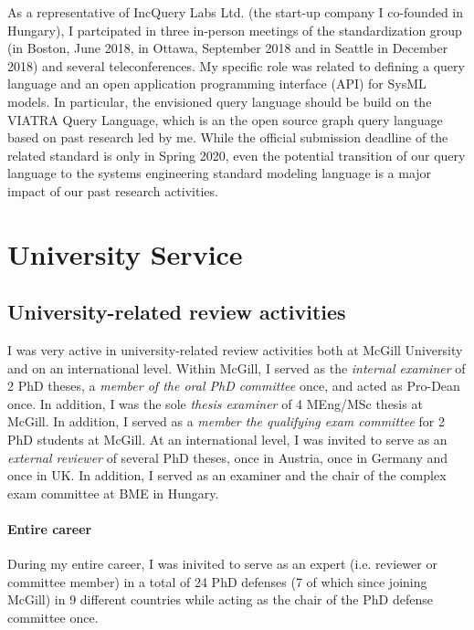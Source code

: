 As a representative of IncQuery Labs Ltd. (the start-up company I co-founded in Hungary), I partcipated in three in-person meetings of the standardization group (in Boston, June 2018, in Ottawa, September 2018 and in Seattle in December 2018) and several teleconferences. My specific role was related to defining a query language and an open application programming interface (API) for SysML models. In particular, the envisioned query language should be build on the VIATRA Query Language, which is an the open source graph query language based on past research led by me. While the official submission deadline of the related standard is only in Spring 2020, even the potential transition of our query language to the systems engineering standard modeling language is a major impact of our past research activities. 

\section{University Service}
\label{sec:university-service}

\subsection{University-related review activities}
I was very active in university-related review activities both at McGill University and on an international level. Within McGill, I served as the \emph{internal examiner} of 2 PhD theses, a \emph{member of the oral PhD committee} once, and acted as Pro-Dean once. In addition, I was the sole \emph{thesis examiner} of 4 MEng/MSc thesis at McGill. In addition, I served as a \emph{member the qualifying exam committee} for 2 PhD students at McGill. 
At an international level, I was invited to serve as an \emph{external reviewer} of several PhD theses, once in Austria, once in Germany and once in UK. In addition, I served as an examiner and the chair of the complex exam committee at BME in Hungary. 

\paragraph{Entire career}
During my entire career, I was inivited to serve as an expert (i.e. reviewer or committee member) in a total of 24 PhD defenses (7 of which since joining McGill) in 9 different countries while acting as the chair of the PhD defense committee once. 

